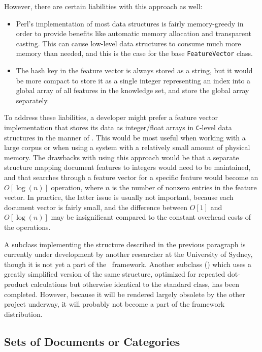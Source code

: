However, there are certain liabilities with this approach as well:

\begin{itemize}
\item Perl's implementation of most data structures is fairly
  memory-greedy in order to provide benefits like automatic memory
  allocation and transparent casting.  This can cause low-level data
  structures to consume much more memory than needed, and this is the
  case for the base \texttt{FeatureVector} class.
\item The hash key in the feature vector is always stored as a string,
  but it would be more compact to store it as a single integer
  representing an index into a global array of all features in the
  knowledge set, and store the global array separately.
\end{itemize}

To address these liabilities, a developer might prefer a feature
vector implementation that stores its data as integer/float arrays in
\texttt{C}-level data structures in the manner of \cite{platt:99}.
This would be most useful when working with a large corpus or when
using a system with a relatively small amount of physical memory.  The
drawbacks with using this approach would be that a separate structure
mapping document features to integers would need to be maintained, and
that searches through a feature vector for a specific feature would
become an $O[\log(n)]$ operation, where $n$ is the number of nonzero
entries in the feature vector.  In practice, the latter issue is
usually not important, because each document vector is fairly small,
and the difference between $O[1]$ and $O[\log(n)]$ may be
insignificant compared to the constant overhead costs of the
operations.

A  subclass implementing the structure described
in the previous paragraph is currently under development by another
researcher at the University of Sydney, though it is not yet a part of
the \aicat\ framework.  Another  subclass
() which uses a greatly simplified
version of the same structure, optimized for repeated dot-product
calculations but otherwise identical to the standard
 class, has been completed.  However, because it
will be rendered largely obsolete by the other project underway, it
will probably not become a part of the framework distribution.

\subsection{Sets of Documents or Categories}

